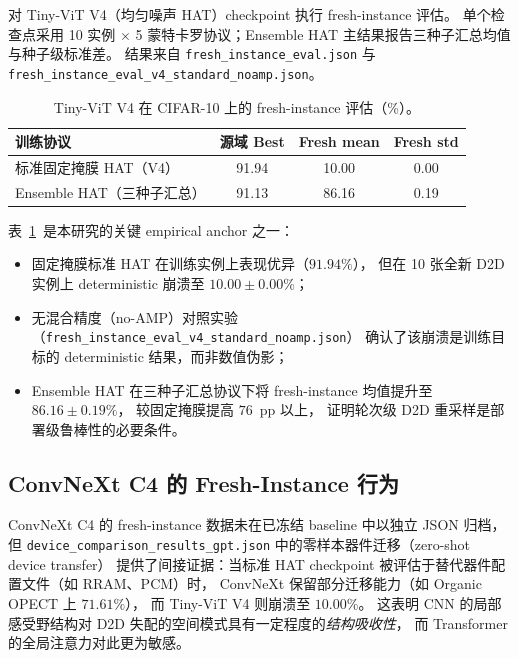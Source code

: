对 Tiny-ViT V4（均匀噪声 HAT）checkpoint 执行 fresh-instance 评估。
单个检查点采用 10 实例 $\times$ 5 蒙特卡罗协议；Ensemble HAT 主结果报告三种子汇总均值与种子级标准差。
结果来自 \texttt{fresh\_instance\_eval.json} 与 \texttt{fresh\_instance\_eval\_v4\_standard\_noamp.json}。

\begin{table}[htbp]
\centering
\caption{Tiny-ViT V4 在 CIFAR-10 上的 fresh-instance 评估（\%）。}
\label{tab:fresh-instance-v4}
\begin{tabular}{@{}lccc@{}}
\toprule
\textbf{训练协议} & \textbf{源域 Best} & \textbf{Fresh mean} & \textbf{Fresh std} \\
\midrule
标准固定掩膜 HAT（V4） & 91.94 & 10.00 & 0.00 \\
Ensemble HAT（三种子汇总） & 91.13 & 86.16 & 0.19 \\
\bottomrule
\end{tabular}
\end{table}

表~\ref{tab:fresh-instance-v4}~是本研究的关键 empirical anchor 之一：
\begin{itemize}
    \item 固定掩膜标准 HAT 在训练实例上表现优异（$91.94\%$），
    但在 10 张全新 D2D 实例上 deterministic 崩溃至 $10.00\pm0.00\%$；
    \item 无混合精度（no-AMP）对照实验（\texttt{fresh\_instance\_eval\_v4\_standard\_noamp.json}）
    确认了该崩溃是训练目标的 deterministic 结果，而非数值伪影；
    \item Ensemble HAT 在三种子汇总协议下将 fresh-instance 均值提升至 $86.16\pm0.19\%$，
    较固定掩膜提高 $76$~pp 以上，
    证明轮次级 D2D 重采样是部署级鲁棒性的必要条件。
\end{itemize}

\subsection{ConvNeXt C4 的 Fresh-Instance 行为}

ConvNeXt C4 的 fresh-instance 数据未在已冻结 baseline 中以独立 JSON 归档，
但 \texttt{device\_comparison\_results\_gpt.json} 中的零样本器件迁移（zero-shot device transfer）
提供了间接证据：当标准 HAT checkpoint 被评估于替代器件配置文件（如 RRAM、PCM）时，
ConvNeXt 保留部分迁移能力（如 Organic OPECT 上 $71.61\%$），
而 Tiny-ViT V4 则崩溃至 $10.00\%$。
这表明 CNN 的局部感受野结构对 D2D 失配的空间模式具有一定程度的\emph{结构吸收性}，
而 Transformer 的全局注意力对此更为敏感。

